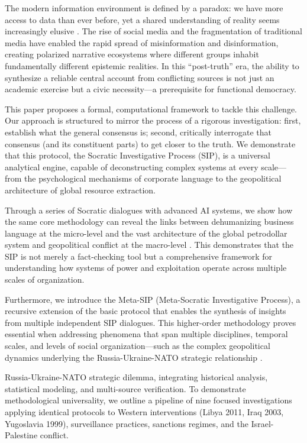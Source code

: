 \documentclass[11pt,a4paper]{article}
\begin{document}
\begin{small}
The modern information environment is defined by a paradox: we have more access to data than ever before, yet a shared understanding of reality seems increasingly elusive \citep{Allcott2017}. The rise of social media and the fragmentation of traditional media have enabled the rapid spread of misinformation and disinformation, creating polarized narrative ecosystems where different groups inhabit fundamentally different epistemic realities. In this ``post-truth'' era, the ability to synthesize a reliable central account from conflicting sources is not just an academic exercise but a civic necessity---a prerequisite for functional democracy.

This paper proposes a formal, computational framework to tackle this challenge. Our approach is structured to mirror the process of a rigorous investigation: first, establish what the general consensus is; second, critically interrogate that consensus (and its constituent parts) to get closer to the truth. We demonstrate that this protocol, the Socratic Investigative Process (SIP), is a universal analytical engine, capable of deconstructing complex systems at every scale---from the psychological mechanisms of corporate language to the geopolitical architecture of global resource extraction.

Through a series of Socratic dialogues with advanced AI systems, we show how the same core methodology can reveal the links between dehumanizing business language at the micro-level and the vast architecture of the global petrodollar system and geopolitical conflict at the macro-level \citep{itog_dialogue}. This demonstrates that the SIP is not merely a fact-checking tool but a comprehensive framework for understanding how systems of power and exploitation operate across multiple scales of organization.

Furthermore, we introduce the Meta-SIP (Meta-Socratic Investigative Process), a recursive extension of the basic protocol that enables the synthesis of insights from multiple independent SIP dialogues. This higher-order methodology proves essential when addressing phenomena that span multiple disciplines, temporal scales, and levels of social organization---such as the complex geopolitical dynamics underlying the Russia-Ukraine-NATO strategic relationship \citep{metasip_dialogue}.

Russia-Ukraine-NATO strategic dilemma, integrating historical 
analysis, statistical modeling, and multi-source verification. To 
demonstrate methodological universality, we outline a pipeline of 
nine focused investigations applying identical protocols to Western 
interventions (Libya 2011, Iraq 2003, Yugoslavia 1999), surveillance 
practices, sanctions regimes, and the Israel-Palestine conflict.


\end{small}
\end{document}
